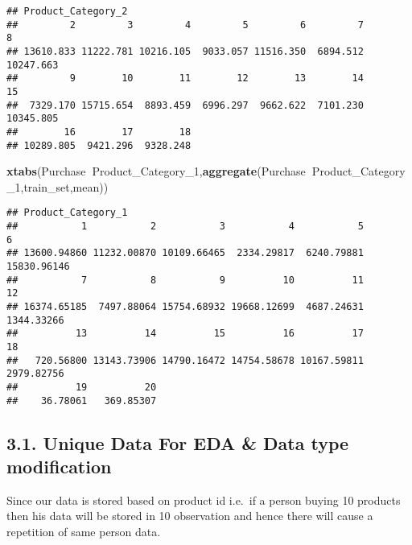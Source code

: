 \documentclass[]{article}
\newenvironment{Shaded}{\begin{snugshade}}{\end{snugshade}}
\newcommand{\KeywordTok}[1]{\textcolor[rgb]{0.13,0.29,0.53}{\textbf{#1}}}
\newcommand{\DecValTok}[1]{\textcolor[rgb]{0.00,0.00,0.81}{#1}}
\newcommand{\OperatorTok}[1]{\textcolor[rgb]{0.81,0.36,0.00}{\textbf{#1}}}
\newcommand{\NormalTok}[1]{#1}
\begin{document}
\begin{verbatim}
## Product_Category_2
##         2         3         4         5         6         7         8 
## 13610.833 11222.781 10216.105  9033.057 11516.350  6894.512 10247.663 
##         9        10        11        12        13        14        15 
##  7329.170 15715.654  8893.459  6996.297  9662.622  7101.230 10345.805 
##        16        17        18 
## 10289.805  9421.296  9328.248
\end{verbatim}

\begin{Shaded}
\begin{Highlighting}[]
\KeywordTok{xtabs}\NormalTok{(Purchase}\OperatorTok{~}\NormalTok{Product_Category_}\DecValTok{1}\NormalTok{,}\KeywordTok{aggregate}\NormalTok{(Purchase}\OperatorTok{~}\NormalTok{Product_Category_}\DecValTok{1}\NormalTok{,train_set,mean))}
\end{Highlighting}
\end{Shaded}

\begin{verbatim}
## Product_Category_1
##           1           2           3           4           5           6 
## 13600.94860 11232.00870 10109.66465  2334.29817  6240.79881 15830.96146 
##           7           8           9          10          11          12 
## 16374.65185  7497.88064 15754.68932 19668.12699  4687.24631  1344.33266 
##          13          14          15          16          17          18 
##   720.56800 13143.73906 14790.16472 14754.58678 10167.59811  2979.82756 
##          19          20 
##    36.78061   369.85307
\end{verbatim}

\subsection{3.1. Unique Data For EDA \& Data type
modification}\label{unique-data-for-eda-data-type-modification}

Since our data is stored based on product id i.e.~if a person buying 10
products then his data will be stored in 10 observation and hence there
will cause a repetition of same person data.
\end{document}
